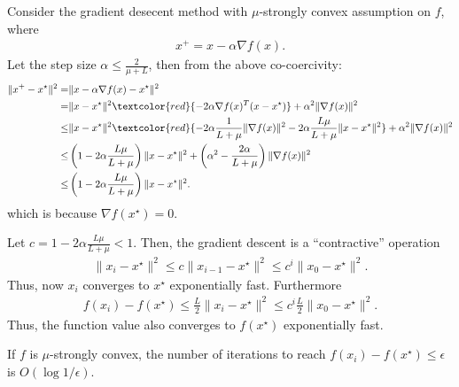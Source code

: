 \documentclass{article}
\begin{document}
Consider the gradient desecent method with $\mu$-strongly convex assumption on $f$, where
\begin{align}
    x^+ = x - \alpha\nabla f(x).
\end{align}
Let the step size $\alpha \leq \frac{2}{\mu+L}$, then from the above co-coercivity:
\begin{align}
    \|x^+-x^\star\|^2 =& \|x - \alpha \nabla f(x) - x^\star\|^2\\
    =& \|x- x^\star\|^2 \textcolor{red}{-2 \alpha \nabla f(x)^T (x-x^\star)} + \alpha^2 \|\nabla f(x)\|^2\\
    \leq& \|x- x^\star\|^2  \textcolor{red}{-2\alpha\frac{1}{L+\mu}\|\nabla f(x)\|^2 - 2\alpha\frac{L\mu}{L+\mu}\|x-x^\star\|^2} + \alpha^2 \|\nabla f(x)\|^2\\
    \leq& \left(1 - 2\alpha \frac{L\mu}{L+\mu} \right) \|x- x^\star\|^2  + \left(\alpha^2  - \frac{2\alpha}{L+\mu}\right)\|\nabla f(x)\|^2\\
    \leq& \left(1 - 2\alpha \frac{L\mu}{L+\mu} \right) \|x- x^\star\|^2.
\end{align}
which is because $\nabla f(x^\star) = 0$.

Let $c = 1 - 2\alpha \frac{L\mu}{L+\mu}<1$.
Then, the gradient descent is a ``contractive'' operation
\begin{align}
    \|x_i-x^\star\|^2 \leq c \|x_{i-1} - x^\star\|^2 \leq c^i \|x_0-x^\star\|^2.
\end{align}
Thus, now $x_i$ converges to $x^\star$ exponentially fast.
Furthermore
\begin{align}
    f(x_i) - f(x^\star) \leq \frac{L}{2}\|x_i- x^\star\|^2 \leq c^i \frac{L}{2} \|x_0 - x^\star\|^2.
\end{align}
Thus, the function value also converges to $f(x^\star)$ exponentially fast.

\begin{remark}
    If $f$ is $\mu$-strongly convex, the number of iterations to reach $f(x_i)-f(x^\star)\leq \epsilon$ is $O(\log 1/\epsilon)$.
\end{remark}


\end{document}
